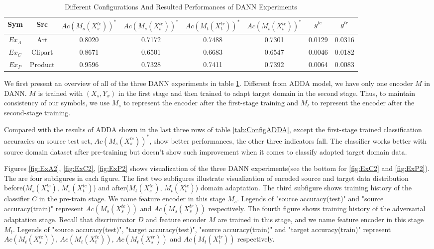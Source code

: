 \documentclass[conference]{IEEEtran}
\begin{document}
 \begin{table}[h]
	\centering
	\caption{Different Configurations And Resulted Performances of DANN Experiments}
	\label{tab:ConfigDANN}
	\begin{tabular}{cccccccc}
		\hline
		Sym & Src & $Ac(M_s(X^{te}_s))^*$ & $Ac(M_s(X^{te}_t))^*$ & $Ac(M_t(X^{tr}_t))^*$ & $Ac(M_t(X^{te}_t))^*$ & $g^{te}$ & $g^{tr}$\\
		\hline
		\hline
		$Ex_A$ &  Art & 0.8020 & 0.7172 & 0.7488 & 0.7301 & 0.0129 & 0.0316\\
		$Ex_C$ &  Clipart & 0.8671 & 0.6501 & 0.6683 & 0.6547 & 0.0046 & 0.0182\\
		$Ex_P$ &  Product &  0.9596 & 0.7328 & 0.7411 & 0.7392 & 0.0064 & 0.0083\\
		\hline
	\end{tabular}
\end{table}
We first present an overview of all of the three DANN experiments in table \ref{tab:ConfigDANN}. Different from ADDA model, we have only one encoder $M$ in DANN. $M$ is trained with $(X_s, Y_x)$ in the first stage and then trained to adapt target domain in the second stage. Thus, to maintain consistency of our symbols, we use $M_s$ to represent the encoder after the first-stage training and $M_t$ to represent the encoder after the second-stage training.

Compared with the results of ADDA shown in the last three rows of table \ref{tab:ConfigADDA}, except the first-stage trained classification accuracies on source test set, $Ac(M_s(X^{te}_s))^*$, show better performances, the other three indicators fall. The classifier works better with source domain dataset after pre-training but doesn't show such improvement when it comes to classify adapted target domain data.

Figures \ref{fig:ExA2}, \ref{fig:ExC2}, \ref{fig:ExP2} shows visualization of the three DANN experiments(see the bottom for \ref{fig:ExC2} and \ref{fig:ExP2}). The are four subfigures in each figure. The first two subfigures illustrate visualization of encoded source and target data distribution before($M_s(X^{te}_s)$, $M_s(X^{te}_t)$) and after($M_t(X^{te}_s)$, $M_t(X^{te}_t)$) domain adaptation. The third subfigure shows training history of the classifier $C$ in the pre-train stage. We name feature encoder in this stage $M_s$. Legends of "source accuracy(test)" and "source accuracy(train)" represent $Ac(M_s(X^{te}_s))$ and $Ac(M_s(X^{tr}_s))$ respectively. The fourth figure shows training history of the adversarial adaptation stage. Recall that discriminator $D$ and feature encoder $M$ are trained in this stage, and we name feature encoder in this stage $M_t$.  Legends of "source accuracy(test)", "target accuracy(test)", "source accuracy(train)" and "target accuracy(train)" represent $Ac(M_t(X^{te}_s))$, $Ac(M_t(X^{te}_t))$, $Ac(M_t(X^{tr}_s))$ and $Ac(M_t(X^{tr}_t))$ respectively.
\end{document}
